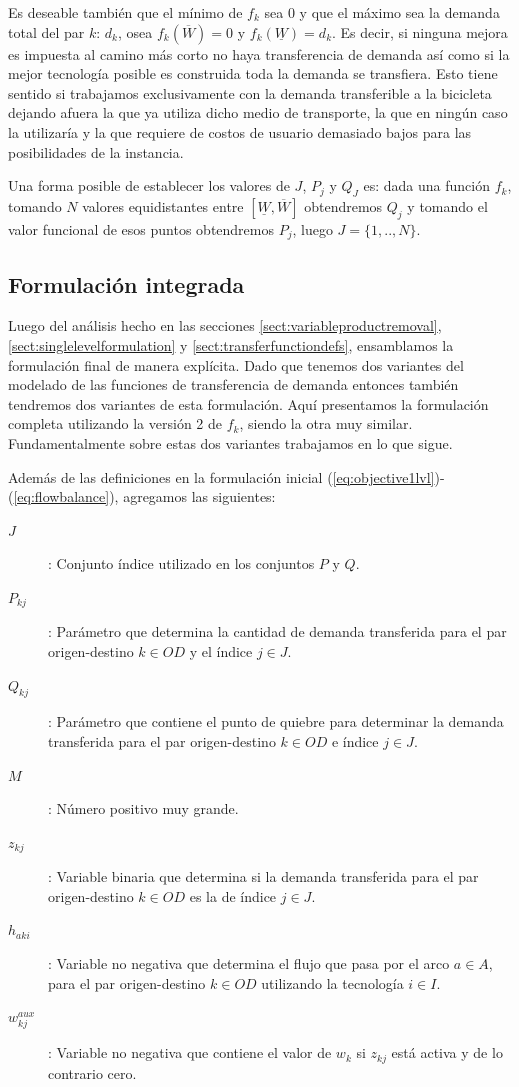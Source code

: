 \documentclass{article}
\begin{document}
  Es deseable también que el mínimo de $f_k$ sea 0 y que el máximo sea la demanda total del par $k$: $d_k$, osea $f_k(\overline{W}) = 0$ y $f_k(\underline{W}) = d_k$. Es decir, si ninguna mejora es impuesta al camino más corto no haya transferencia de demanda así como si la mejor tecnología posible es construida toda la demanda se transfiera. Esto tiene sentido si trabajamos exclusivamente con la demanda transferible a la bicicleta dejando afuera la que ya utiliza dicho medio de transporte, la que en ningún caso la utilizaría y la que requiere de costos de usuario demasiado bajos para las posibilidades de la instancia.

  Una forma posible de establecer los valores de $J$, $P_j$ y $Q_J$ es: dada una función $f_k$, tomando $N$ valores equidistantes entre $[\underline{W}, \overline{W}]$ obtendremos $Q_j$ y tomando el valor funcional de esos puntos obtendremos $P_j$, luego $J=\{1,..,N\}$.

  \subsection{Formulación integrada}
  \label{sect:alltogether}

  Luego del análisis hecho en las secciones \ref{sect:variableproductremoval}, \ref{sect:singlelevelformulation} y \ref{sect:transferfunctiondefs}, ensamblamos la formulación final de manera explícita. Dado que tenemos dos variantes del modelado de las funciones de transferencia de demanda entonces también tendremos dos variantes de esta formulación. Aquí presentamos la formulación completa utilizando la versión 2 de $f_k$, siendo la otra muy similar. Fundamentalmente sobre estas dos variantes trabajamos en lo que sigue.

  Además de las definiciones en la formulación inicial (\ref{eq:objective1lvl})-(\ref{eq:flowbalance}), agregamos las siguientes:

  \begin{description}
    \item[$J$]: Conjunto índice utilizado en los conjuntos $P$ y $Q$.
    \item[$P_{kj}$]: Parámetro que determina la cantidad de demanda transferida para el par origen-destino $k \in OD$ y el índice $j \in J$.
    \item[$Q_{kj}$]: Parámetro que contiene el punto de quiebre para determinar la demanda transferida para el par origen-destino $k \in OD$ e índice $j \in J$.
    \item[$M$]: Número positivo muy grande.
    \item[$z_{kj}$]: Variable binaria que determina si la demanda transferida para el par origen-destino $k \in OD$ es la de índice $j \in J$.
    \item[$h_{aki}$]: Variable no negativa que determina el flujo que pasa por el arco $a \in A$, para el par origen-destino $k \in OD$ utilizando la tecnología $i \in I$.
    \item[$w^{aux}_{kj}$]: Variable no negativa que contiene el valor de $w_{k}$ si $z_{kj}$ está activa y de lo contrario cero.
  \end{description}
\end{document}
